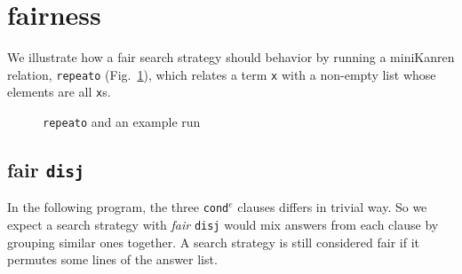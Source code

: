 \documentclass[format=acmlarge, review=true, authordraft=true]{acmart}
\newcommand{\conde}{\texttt{cond$^e$} }
\begin{document}

\section{fairness}

We illustrate how a fair search strategy should behavior by running a miniKanren relation, \texttt{repeato} (Fig.~\ref{repeato}), which relates a term \texttt{x} with a non-empty list whose elements are all \texttt{x}s.

\begin{figure}
	
	\caption{\texttt{repeato} and an example run}
	\label{repeato}
\end{figure}

\subsection{fair \texttt{disj}}

In the following program, the three \conde clauses differs in trivial way. So we expect a search strategy with \emph{fair} \texttt{disj} would mix answers from each clause by grouping similar ones together. A search strategy is still considered fair if it permutes some lines of the answer list.

\begin{center}
	\begin{tabular}{c}
		
	\end{tabular}
\end{center}
\end{document}
